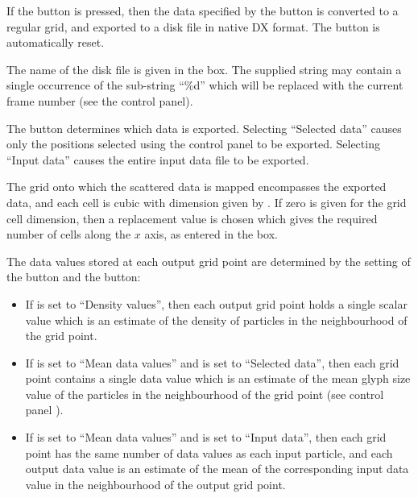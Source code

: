 \begin{description}
If the  button is pressed, then the data specified by the
 button is converted to a regular grid, and exported to a
disk file in native DX format. The button is automatically reset.

The name of the disk file is given in the  box. The
supplied string may contain a single occurrence of the sub-string ``\%d''
which will be replaced with the current frame number (see the  control panel).

The  button determines which data is exported.
Selecting ``Selected data'' causes only the positions selected using the
 control panel to be exported.
Selecting ``Input data'' causes the entire input data file to be exported.

The grid onto which the scattered data is mapped encompasses the exported
data, and each cell is cubic with dimension given by . If zero is given for the grid cell dimension, then a
replacement value is chosen which gives the required number of cells
along the $x$ axis, as entered in the  box.

The data values stored at each output grid point are determined by the
setting of the  button and the 
button:
\begin{itemize}

\item If  is set to ``Density values'', then each output
grid point holds a single scalar value which is an estimate of the
density of particles in the neighbourhood of the grid point.

\item If  is set to ``Mean data values'' and
 is set to ``Selected data'', then each grid point contains
a single data value which is an estimate of the mean glyph size value
of the particles in the neighbourhood of the grid point (see control
panel ).

\item If   is set to ``Mean data values'' and
 is set to ``Input data'', then each grid point has the
same number of data values as each input particle, and each output data
value is an estimate of the mean of the corresponding input data value in
the neighbourhood of the output grid point.


\end{itemize}
\end{description}
